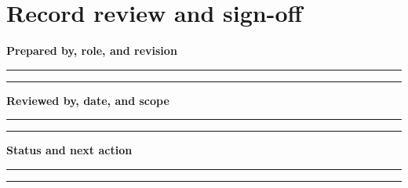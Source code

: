 \documentclass[11pt,letterpaper]{article}
\newcommand{\Field}[2]{\par\noindent\textbf{#1}\par\vspace{1em}\noindent\rule{0.96\linewidth}{0.4pt}\par\vspace{1.0em}\noindent\rule{0.96\linewidth}{0.4pt}\par\vspace{1em}}
\begin{document}
\section{Record review and sign-off}
\Field{Prepared by, role, and revision}{Provide author, contact, version, and creation date.}
\Field{Reviewed by, date, and scope}{Record who reviewed which evidence and what remains open.}
\Field{Status and next action}{Distinguish unreviewed, draft, reviewed, approved, and superseded; attach approvals separately.}
\end{document}

